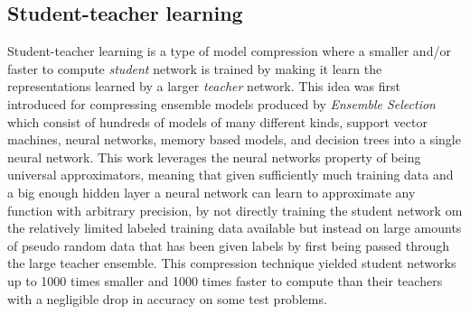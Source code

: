 \documentclass[11pt]{article}
\newcommand{\bibentry}[1]{\cite{#1}}
\begin{document}
\subsection*{Student-teacher learning}
\label{sec:org142d5dc}
Student-teacher learning is a type of model compression where a smaller and/or faster to compute \emph{student} network is trained by making it learn the representations learned by a larger \emph{teacher} network. This idea was first introduced for compressing ensemble models produced by \emph{Ensemble Selection}\bibentry{caruana2004ensemble} which consist of hundreds of models of many different kinds, support vector machines, neural networks, memory based models, and decision trees into a single neural network\bibentry{bucilua2006model}. This work leverages the neural networks property of being universal approximators\bibentry{cybenko1989approximation}, meaning that given sufficiently much training data and a big enough hidden layer a neural network can learn to approximate any function with arbitrary precision, by not directly training the student network om the relatively limited labeled training data available but instead on large amounts of pseudo random data that has been given labels by first being passed through the large teacher ensemble. This compression technique yielded student networks up to 1000 times smaller and 1000 times faster to compute than  their teachers with a negligible drop in accuracy on some test problems.
\end{document}
